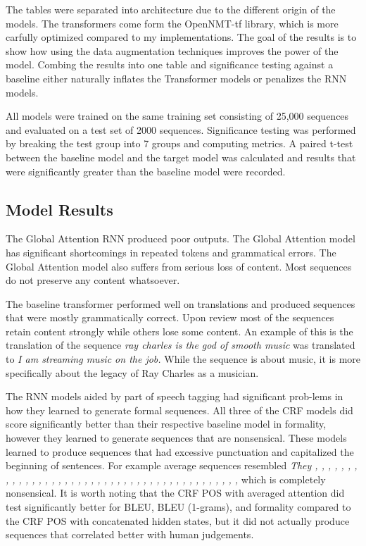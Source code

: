 \documentclass[12pt]{article}
\begin{document}
\par
The tables were separated into architecture due to the different origin of the models. The transformers come form the 
OpenNMT-tf library, which is more carfully optimized compared to my implementations. The goal
of the results is to show how using the data augmentation techniques improves the power of
the model. Combing the results into one table and significance testing against a baseline 
either naturally inflates the Transformer models or penalizes the RNN models. 

\par
All models were trained on the same training set consisting of 25,000 sequences and evaluated
on a test set of 2000 sequences. Significance testing was performed by breaking the test group
into 7 groups and computing metrics. A paired t-test between the baseline model and the 
target model was calculated and results that were significantly greater than the baseline model
were recorded. 


\subsection{Model Results}
\par
The Global Attention RNN produced poor outputs. The Global Attention model has significant shortcomings in 
repeated tokens and grammatical errors. The Global Attention model also suffers 
from serious loss of content. Most sequences do not preserve any content whatsoever. \par

The baseline transformer performed well on translations and produced sequences that were mostly
grammatically correct. Upon review most of the sequences retain content strongly while others 
lose some content. An example of this is the translation of the sequence \textit{ray charles is 
the god of smooth music} was translated to \textit{I am streaming music on the job.} While the sequence
is about music, it is more specifically about the legacy of Ray Charles as a musician.  \par

The RNN models aided by part of speech tagging had significant prob-lems in how they learned 
to generate formal sequences. All three of the CRF models did score significantly better 
than their respective baseline model in formality, however they learned to generate sequences that are
nonsensical. These models learned to produce sequences that had excessive punctuation and
capitalized the beginning of sentences. For example average sequences resembled 
\textit{They , , , , , , , , , , , , , , , , , , , , , , , , , , , , , , , , , , , , , , , , , , ,}
which is completely nonsensical. It is worth noting that the CRF POS with averaged attention
did test significantly better for BLEU, BLEU (1-grams), and formality compared
to the CRF POS with concatenated hidden states, but it did not actually produce 
sequences that correlated better with human judgements. \par 
\end{document}
